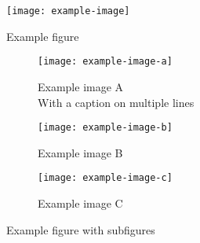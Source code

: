 \documentclass{article}
\begin{document}
\begin{figure}
    \centering
    \texttt{[image: example-image]}
    \caption{Example figure}
    \label{fig:example}
\end{figure}

\begin{figure}
    \centering
    \captionsetup[subfigure]{justification=centering}
    \begin{subfigure}[t]{0.45\textwidth}
        \centering
        \texttt{[image: example-image-a]}
        \caption{Example image A \\ With a caption on multiple lines}
        \label{fig:example A}
    \end{subfigure}
    \hfill
    \begin{subfigure}[t]{0.45\textwidth}
        \centering
        \texttt{[image: example-image-b]}
        \caption{Example image B}
        \label{fig:example B}
    \end{subfigure}
    \newline
    \begin{subfigure}{0.45\textwidth}
        \centering
        \texttt{[image: example-image-c]}
        \caption{Example image C}
        \label{fig:example C}
    \end{subfigure}
    \caption{Example figure with subfigures}
    \label{fig:example with subfigures}
\end{figure}
\end{document}
